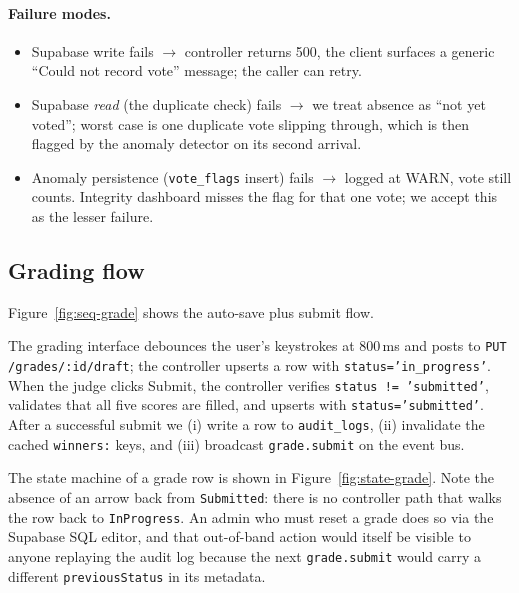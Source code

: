 
\paragraph{Failure modes.}
\begin{itemize}[leftmargin=*]
  \item Supabase write fails $\rightarrow$ controller returns 500, the
        client surfaces a generic ``Could not record vote'' message; the
        caller can retry.
  \item Supabase \emph{read} (the duplicate check) fails $\rightarrow$ we
        treat absence as ``not yet voted''; worst case is one duplicate
        vote slipping through, which is then flagged by the anomaly
        detector on its second arrival.
  \item Anomaly persistence (\texttt{vote\_flags} insert) fails $\rightarrow$
        logged at WARN, vote still counts. Integrity dashboard misses the
        flag for that one vote; we accept this as the lesser failure.
\end{itemize}

\subsection{Grading flow}
\label{sub:grade-flow}

Figure~\ref{fig:seq-grade} shows the auto-save plus submit flow.


The grading interface debounces the user's keystrokes at 800\,ms and posts
to \texttt{PUT /grades/:id/draft}; the controller upserts a row with
\texttt{status='in\_progress'}. When the judge clicks Submit, the
controller verifies \texttt{status != 'submitted'}, validates that all
five scores are filled, and upserts with \texttt{status='submitted'}.
After a successful submit we (i) write a row to \texttt{audit\_logs},
(ii) invalidate the cached \texttt{winners:} keys, and (iii) broadcast
\texttt{grade.submit} on the event bus.

The state machine of a grade row is shown in
Figure~\ref{fig:state-grade}. Note the absence of an arrow back from
\texttt{Submitted}: there is no controller path that walks the row back
to \texttt{InProgress}. An admin who must reset a grade does so via the
Supabase SQL editor, and that out-of-band action would itself be visible
to anyone replaying the audit log because the next \texttt{grade.submit}
would carry a different \texttt{previousStatus} in its metadata.

